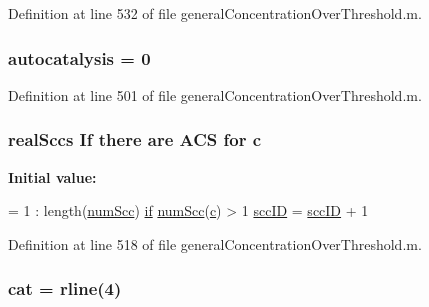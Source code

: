 Definition at line 532 of file general\-Concentration\-Over\-Threshold.\-m.

\hypertarget{a00022_a2d0b5f62c8a18e8cbfeb15c6f8856c5a}{
\subsubsection[{autocatalysis}]{\setlength{\rightskip}{0pt plus 5cm}autocatalysis = 0}}\label{a00022_a2d0b5f62c8a18e8cbfeb15c6f8856c5a}


Definition at line 501 of file general\-Concentration\-Over\-Threshold.\-m.

\hypertarget{a00022_a0f16b7d4c8c225e06e6a8b2081508e64}{
\subsubsection[{c}]{ {\bf real\-Sccs} If there are {\bf A\-C\-S} for c}}\label{a00022_a0f16b7d4c8c225e06e6a8b2081508e64}
{\bfseries Initial value\-:}
\begin{DoxyCode}
= 1 : length(\hyperlink{a00022_a0d0db21d4520f7561ff56e2c80e4fb69}{numScc})
                \hyperlink{a00019_adf3394dfd4755fd0ef2854fe558ff8aa}{if} \hyperlink{a00022_a0d0db21d4520f7561ff56e2c80e4fb69}{numScc}(\hyperlink{a00021_a8e54ca14679a1ce9245a3b7d55d95570}{c}) > 1
                    \hyperlink{a00022_a85ff953f350ff6660d5f3489e31d57b6}{sccID} = \hyperlink{a00022_a85ff953f350ff6660d5f3489e31d57b6}{sccID} + 1
\end{DoxyCode}


Definition at line 518 of file general\-Concentration\-Over\-Threshold.\-m.

\hypertarget{a00022_a7073f71a43389f3032e69b1fffc2551a}{
\subsubsection[{cat}]{\setlength{\rightskip}{0pt plus 5cm}cat = {\bf rline}(4)}}\label{a00022_a7073f71a43389f3032e69b1fffc2551a}


